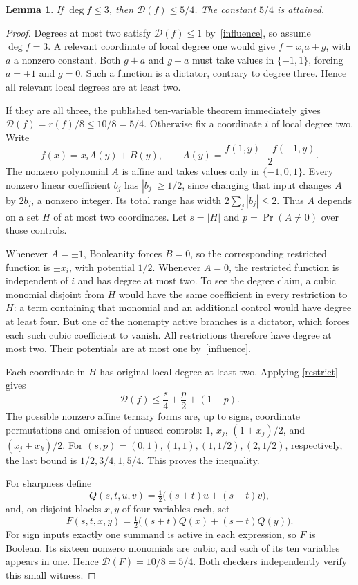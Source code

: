 \documentclass[11pt]{amsart}
\newtheorem{lemma}[theorem]{Lemma}
\newcommand{\D}{\mathcal D}
\begin{document}
\begin{lemma}\label{cap}
If $\deg f\le3$, then $\D(f)\le5/4$. The constant $5/4$ is attained.
\end{lemma}
\begin{proof}
Degrees at most two satisfy $\D(f)\le1$ by~\eqref{influence}, so assume
$\deg f=3$. A relevant coordinate of local degree one would give
$f=x_i a+g$, with $a$ a nonzero constant. Both $g+a$ and $g-a$ must take
values in $\{-1,1\}$, forcing $a=\pm1$ and $g=0$. Such a function is a
dictator, contrary to degree three. Hence all relevant local degrees are
at least two.

If they are all three, the published ten-variable theorem immediately gives
$\D(f)=r(f)/8\le10/8=5/4$. Otherwise fix a coordinate $i$ of local degree
two. Write
\[
 f(x)=x_i A(y)+B(y),\qquad
 A(y)=\frac{f(1,y)-f(-1,y)}2.
\]
The nonzero polynomial $A$ is affine and takes values only in $\{-1,0,1\}$.
Every nonzero linear coefficient $b_j$ has $|b_j|\ge1/2$, since changing
that input changes $A$ by $2b_j$, a nonzero integer. Its total range has
width $2\sum_j|b_j|\le2$. Thus $A$ depends on a set $H$ of at most two
coordinates. Let $s=|H|$ and $p=\Pr(A\ne0)$ over those controls.

Whenever $A=\pm1$, Booleanity forces $B=0$, so the corresponding restricted
function is $\pm x_i$, with potential $1/2$. Whenever $A=0$, the restricted
function is independent of $i$ and has degree at most two. To see the degree
claim, a cubic monomial disjoint from $H$ would have the same coefficient
in every restriction to $H$: a term containing that monomial and an additional
control would have degree at least four. But one of the nonempty active
branches is a dictator, which forces each such cubic coefficient to vanish.
All restrictions therefore have degree at most two. Their potentials are
at most one by~\eqref{influence}.

Each coordinate in $H$ has original local degree at least two. Applying
\eqref{restrict} gives
\[
 \D(f)\le\frac{s}{4}+\frac p2+(1-p).
\]
The possible nonzero affine ternary forms are, up to signs, coordinate
permutations and omission of unused controls: $1$, $x_j$,
$(1+x_j)/2$, and $(x_j+x_k)/2$.
For $(s,p)=(0,1),(1,1),(1,1/2),(2,1/2)$, respectively, the last bound is
$1/2,3/4,1,5/4$. This proves the inequality.

For sharpness define
\[
 Q(s,t,u,v)=\tfrac12\bigl((s+t)u+(s-t)v\bigr),
\]
and, on disjoint blocks $x,y$ of four variables each, set
\[
 F(s,t,x,y)=\tfrac12\bigl((s+t)Q(x)+(s-t)Q(y)\bigr).
\]
For sign inputs exactly one summand is active in each expression, so $F$
is Boolean. Its sixteen nonzero monomials are cubic, and each of its ten
variables appears in one. Hence $\D(F)=10/8=5/4$. Both checkers independently
verify this small witness.
\end{proof}
\end{document}
